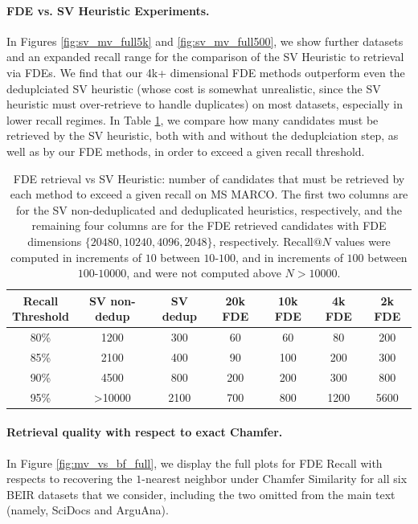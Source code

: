 \paragraph{FDE vs. SV Heuristic Experiments.} In Figures \ref{fig:sv_mv_full5k} and \ref{fig:sv_mv_full500}, we show further datasets and an expanded recall range for the comparison of the SV Heuristic to retrieval via FDEs. We find that our 4k+ dimensional FDE methods outperform even the deduplciated SV heuristic (whose cost is somewhat unrealistic, since the SV heuristic must over-retrieve to handle duplicates) on most datasets, especially in lower recall regimes. 
In Table \ref{table:sv_mv_table}, we compare how many candidates must be retrieved by the SV heuristic, both with and without the deduplciation step, as well as by our FDE methods, in order to exceed a given recall threshold. 


\begin{table}[h!]
    \centering
    \begin{tabular}{|c|c|c|c|c|c|c|} \hline
\makecell{Recall\\ Threshold} &SV non-dedup  & SV dedup & 20k FDE & 10k FDE &4k FDE&  2k FDE  \\ \hline
80\% & 1200 & 300 & 60 & 60& 80 & 200\\  \hline
85\% & 2100 & 400&  90 & 100 & 200& 300 \\  \hline
90\% &4500 & 800& 200 & 200& 300 &  800 \\ \hline
95\% & >10000& 2100 & 700 &800  & 1200 & 5600 \\ \hline 
\end{tabular}
\vspace{1em}
  \caption{FDE retrieval vs SV Heuristic: number of candidates that must be retrieved by each method to exceed a given recall on MS MARCO. The first two columns are for the SV non-deduplicated and deduplicated heuristics, respectively, and the remaining four columns are for the FDE retrieved candidates with FDE dimensions $\{20480,10240,4096,2048\}$, respectively. Recall$@N$ values were computed in increments of $10$ between $10$-$100$, and in increments of $100$ between $100$-$10000$, and were not computed above $N > 10000$.  } 
    \label{table:sv_mv_table}
\end{table}


\paragraph{Retrieval quality with respect to exact Chamfer.} In Figure \ref{fig:mv_vs_bf_full}, we display the full plots for FDE Recall with respects to recovering the $1$-nearest neighbor under Chamfer Similarity for all six BEIR datasets that we consider, including the two omitted from the main text (namely, SciDocs and ArguAna). 



